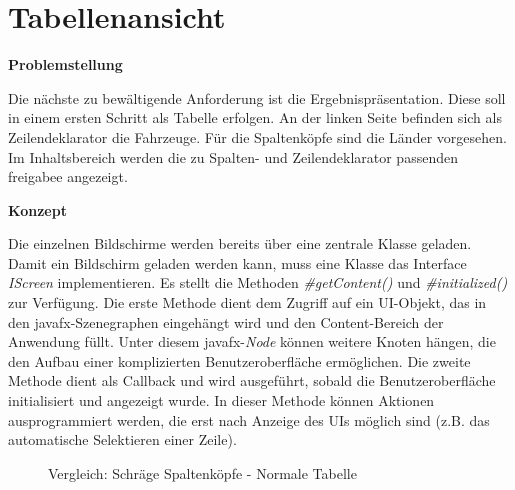 \section{Tabellenansicht} \label{sec:implTabelle}
\textbf{Problemstellung}

Die nächste zu bewältigende Anforderung ist die Ergebnispräsentation. Diese soll in einem ersten Schritt als Tabelle erfolgen. An der linken Seite befinden sich als Zeilendeklarator die Fahrzeuge. Für die Spaltenköpfe sind die Länder vorgesehen. Im Inhaltsbereich werden die zu Spalten- und Zeilendeklarator passenden \gls{freigabe}e angezeigt. 

\textbf{Konzept}

Die einzelnen Bildschirme werden bereits über eine zentrale Klasse geladen. Damit ein Bildschirm geladen werden kann, muss eine Klasse das Interface \textit{IScreen} implementieren. Es stellt die Methoden \textit{\#getContent()} und \textit{\#initialized()} zur Verfügung. Die erste Methode dient dem Zugriff auf ein UI-Objekt, das in den \gls{javafx}-Szenegraphen eingehängt wird und den Content-Bereich der Anwendung füllt. Unter diesem \gls{javafx}-\textit{Node} können weitere Knoten hängen, die den Aufbau einer komplizierten Benutzeroberfläche ermöglichen. Die zweite Methode dient als Callback und wird ausgeführt, sobald die Benutzeroberfläche initialisiert und angezeigt wurde. In dieser Methode können Aktionen ausprogrammiert werden, die erst nach Anzeige des UIs möglich sind (z.B. das automatische Selektieren einer Zeile).

\begin{figure}[H] 
	\centering
	\hspace{2.0em}
	\caption{Vergleich: Schräge Spaltenköpfe - Normale Tabelle}
	\label{fig:tabelle1}
\end{figure}



